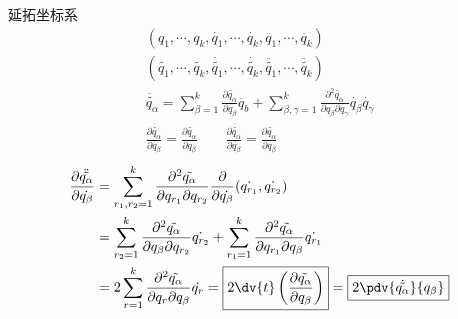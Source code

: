 \documentclass[12pt, a4paper, oneside, UTF8]{ctexbook}  %
\newcommand{\pa}{\partial}
\begin{document}
\begin{defn}
    延拓坐标系
\begin{gather*}
    (q_1,\cdots,q_k,\dot{q_1},\cdots,\dot{q_k},\ddot{q_1},\cdots,\ddot{q_k}
)    \\ (\tilde{q_1},\cdots,\tilde{q_k},\dot{\tilde{q_1}},\cdots,\dot{\tilde{q_k}},\ddot{\tilde{q_1}},\cdots,\ddot{\tilde{q_k}}
)    \\ \ddot{\tilde{q_\alpha}}=
\sum_{\beta=1}^{k} \frac{\partial \tilde{q_\alpha}}{\partial q_{\beta}} \ddot{q_b} 
+ \sum_{\beta,\gamma=1}^{k} \frac{\partial^{2} \tilde{q_\alpha}}
{\partial q_{\beta} \partial q_{\gamma}} \dot{q_\beta} \dot{q_\gamma}
\\\frac{\partial\dot{\tilde{q_\alpha}}}{\partial \dot{q_{\beta}}}
=\frac{\partial\tilde{q_\alpha}}{\partial q_{\beta}}\qquad
\frac{\partial\ddot{\tilde{q_\alpha}}}{\partial \ddot{q_{\beta}}}
=\frac{\partial\tilde{q_\alpha}}{\partial q_{\beta}}
\end{gather*}  
\begin{align*}
    \frac{\partial\ddot{\tilde{q_\alpha}}}{\partial \dot{q_{\beta}}}
&=\sum_{r_{1},r_{2}=1}^{k}\frac{\partial^{2}\tilde{q_\alpha}}
{\partial q_{r_1}\partial q_{r_2}}
\frac{\partial}{\partial \dot{q_\beta}}(\dot{q_{r_{1}}},\dot{q_{r_{2}}})
\\&=\sum_{r_{2}=1}^{k}\frac{\partial^{2}\tilde{q_\alpha}}
{\partial q_{\beta}\partial q_{r_2}}\dot{q_{r_{2}}}+
\sum_{r_{1}=1}^{k}\frac{\partial^{2}\tilde{q_\alpha}}
{\partial q_{r_1}\partial q_{\beta}}\dot{q_{r_{1}}}
\\&=2\sum_{r=1}^{k}\frac{\partial^{2}\tilde{q_\alpha}}
{\partial q_{r}\partial q_{\beta}}\dot{q_{r}}
=\boxed{2\dv{t}\left(\frac{\pa \tilde{q_\alpha}}{\pa q_\beta}\right)}
=\boxed{2\pdv{\dot{\tilde{q_\alpha}}}{q_\beta}}
\end{align*}  
\end{defn}
\end{document}

